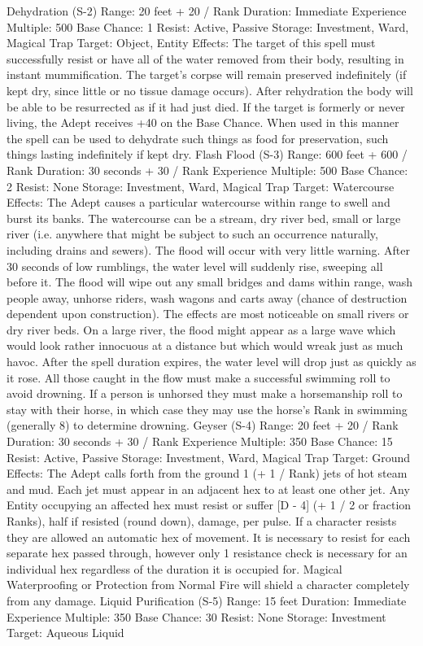 \documentclass[a4paper]{article}
\begin{document}
\begin{multicols}{3}
Dehydration (S-2)
Range: 20 feet + 20 / Rank
Duration: Immediate
Experience Multiple: 500
Base Chance: 1%
Resist: Active, Passive
Storage: Investment, Ward, Magical Trap
Target: Object, Entity
Effects: The target of this spell must successfully
resist or have all of the water removed from their
body, resulting in instant mummification. The
target’s corpse will remain preserved indefinitely
(if kept dry, since little or no tissue damage occurs). After rehydration the body will be able to be
resurrected as if it had just died. If the target is
formerly or never living, the Adept receives +40%
on the Base Chance. When used in this manner the
spell can be used to dehydrate such things as food
for preservation, such things lasting indefinitely if
kept dry.
Flash Flood (S-3)
Range: 600 feet + 600 / Rank
Duration: 30 seconds + 30 / Rank
Experience Multiple: 500
Base Chance: 2%
Resist: None
Storage: Investment, Ward, Magical Trap
Target: Watercourse
Effects: The Adept causes a particular watercourse
within range to swell and burst its banks. The
watercourse can be a stream, dry river bed, small
or large river (i.e. anywhere that might be subject
to such an occurrence naturally, including drains
and sewers). The flood will occur with very little
warning. After 30 seconds of low rumblings, the
water level will suddenly rise, sweeping all before
it. The flood will wipe out any small bridges and
dams within range, wash people away, unhorse
riders, wash wagons and carts away (chance of
destruction dependent upon construction). The
effects are most noticeable on small rivers or dry
river beds. On a large river, the flood might appear
as a large wave which would look rather innocuous
at a distance but which would wreak just as much
havoc. After the spell duration expires, the water
level will drop just as quickly as it rose. All those
caught in the flow must make a successful swimming roll to avoid drowning. If a person is unhorsed they must make a horsemanship roll to stay
with their horse, in which case they may use the
horse’s Rank in swimming (generally 8) to determine drowning.
Geyser (S-4)
Range: 20 feet + 20 / Rank
Duration: 30 seconds + 30 / Rank
Experience Multiple: 350
Base Chance: 15%
Resist: Active, Passive
Storage: Investment, Ward, Magical Trap
Target: Ground
Effects: The Adept calls forth from the ground 1 (+
1 / Rank) jets of hot steam and mud. Each jet must
appear in an adjacent hex to at least one other jet.
Any Entity occupying an affected hex must resist
or suffer [D - 4] (+ 1 / 2 or fraction Ranks), half if
resisted (round down), damage, per pulse. If a
character resists they are allowed an automatic hex
of movement. It is necessary to resist for each
separate hex passed through, however only 1 resistance check is necessary for an individual hex
regardless of the duration it is occupied for. Magical Waterproofing or Protection from Normal Fire
will shield a character completely from any damage.
Liquid Purification (S-5)
Range: 15 feet
Duration: Immediate
Experience Multiple: 350
Base Chance: 30%
Resist: None
Storage: Investment
Target: Aqueous Liquid


\end{multicols}
\end{document}
